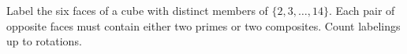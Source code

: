 Label the six faces of a cube with distinct members of $\{2,3,\ldots,14\}$. Each pair of opposite faces must contain either two primes or two composites. Count labelings up to rotations.
